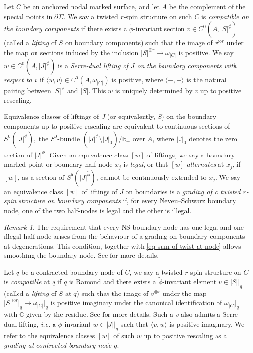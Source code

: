\documentclass[11pt]{amsart}
\theoremstyle{definition}
\theoremstyle{remark}
\newtheorem{rmk}[dummy]{Remark}
\newcommand{\<}{\left<}
\renewcommand{\>}{\right>}
\numberwithin{equation}{section}
\begin{document}
Let $C$ be an anchored nodal marked surface, and let $A$ be the complement of the special points in $\partial \Sigma$.  We say a twisted $r$-spin structure on such $C$ is \textit{compatible on the boundary components} if there exists a $\widetilde{\phi}$-invariant section $v \in C^0\left(A, |S|^{\widetilde{\phi}}\right)$ (called a \textit{lifting} of $S$  on boundary components) such that the image of $v^{\otimes r}$ under the map on sections induced by the inclusion $|S|^{\otimes r} \to  \omega_{|C|}$ is positive.  We say $w \in C^0\left(A, |J|^{\widetilde{\phi}}\right)$ is a \textit{Serre-dual lifting of $J$ on the boundary components with respect to $v$} if $\langle w, v \rangle \in C^0(A, \omega_{|C|})$ is positive, where $\langle -, - \rangle$ is the natural pairing between $|S|^{\vee}$ and $|S|$.  This $w$ is uniquely determined by $v$ up to positive rescaling.

 Equivalence classes of liftings of %
$J$ (or equivalently, %
$S$) on the boundary components up to positive rescaling are equivalent to continuous sections of $S^0(|J|^{\widetilde\phi}),$ the $S^0$-bundle $\left(|J|^{\widetilde{\phi}}\setminus |J|_0\right)\big/ \mathbb R_+$ over $A$, where $|J|_0$ denotes the zero section of $|J|^{\widetilde{\phi}}$. Given an equivalence class $[w]$  of liftings, we say a boundary marked point or boundary half-node $x_j$ is \textit{legal}, or that $[w]$ \textit{alternates} at $x_j$, if $[w]$, as a section of $S^0(|J|^{\widetilde\phi})$, cannot be continuously extended to $x_j$.
We say an equivalence class $[w]$ of liftings of $J$ on boundaries is a \textit{grading of a twisted $r$-spin structure on boundary components} if, for every Neveu--Schwarz boundary node, one of the two half-nodes is legal and the other is illegal. 
\begin{rmk}
    The requirement that every NS boundary node has one legal and one illegal half-node arises from the behaviour of a grading on boundary components at degenerations. This condition, together %
with \eqref{eq sum of twist at node} allows %
smoothing the boundary node. See \cite{BCT1} for more details.
\end{rmk}

Let $q$ be a contracted boundary node of $C$, we say a twisted $r$-spin structure on $C$ is \textit{compatible} at $q$ if $q$ is Ramond and there exists a $\widetilde{\phi}$-invariant element $v \in |S|\big|_q$  (called a \textit{lifting} of $S$ at $q$) such that the image of $v^{\otimes r}$ under the map $|S|^{\otimes r}\big|_q \to \omega_{|C|}\big|_q$ is positive imaginary under the canonical identification of $\omega_{|C|}\big|_q$ with ${\mathbb{C}}$ given by the residue. See \cite[Definition 2.8]{BCT1} for more details.  Such a $v$ also admits a Serre-dual lifting, \textit{i.e.}  a $\widetilde{\phi}$-invariant $w \in |J|\big\vert_q$ such that $\langle v, w \rangle$ is positive imaginary.  We refer to the equivalence classes $[w]$ of such $w$ up to positive rescaling as a \textit{grading at contracted boundary node $q$}.
\end{document}

